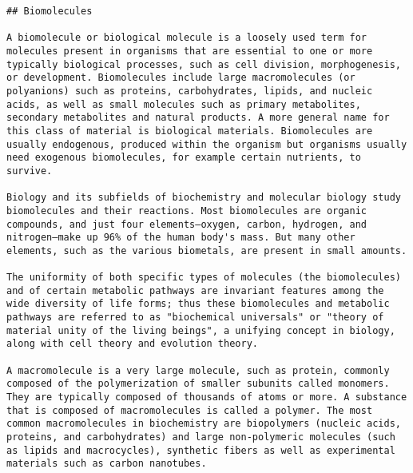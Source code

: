 \begin{verbatim}
## Biomolecules

A biomolecule or biological molecule is a loosely used term for molecules present in organisms that are essential to one or more typically biological processes, such as cell division, morphogenesis, or development. Biomolecules include large macromolecules (or polyanions) such as proteins, carbohydrates, lipids, and nucleic acids, as well as small molecules such as primary metabolites, secondary metabolites and natural products. A more general name for this class of material is biological materials. Biomolecules are usually endogenous, produced within the organism but organisms usually need exogenous biomolecules, for example certain nutrients, to survive.

Biology and its subfields of biochemistry and molecular biology study biomolecules and their reactions. Most biomolecules are organic compounds, and just four elements—oxygen, carbon, hydrogen, and nitrogen—make up 96% of the human body's mass. But many other elements, such as the various biometals, are present in small amounts.

The uniformity of both specific types of molecules (the biomolecules) and of certain metabolic pathways are invariant features among the wide diversity of life forms; thus these biomolecules and metabolic pathways are referred to as "biochemical universals" or "theory of material unity of the living beings", a unifying concept in biology, along with cell theory and evolution theory.

A macromolecule is a very large molecule, such as protein, commonly composed of the polymerization of smaller subunits called monomers. They are typically composed of thousands of atoms or more. A substance that is composed of macromolecules is called a polymer. The most common macromolecules in biochemistry are biopolymers (nucleic acids, proteins, and carbohydrates) and large non-polymeric molecules (such as lipids and macrocycles), synthetic fibers as well as experimental materials such as carbon nanotubes.


\end{verbatim}
